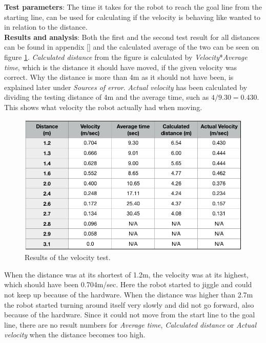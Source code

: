 \textbf{Test parameters}: The time it takes for the robot to reach the goal line from the starting line, can be used for calculating if the velocity is behaving like wanted to in relation to the distance.\\

\textbf{Results and analysis}: Both the first and the second test result for all distances can be found in appendix \ref{} and the calculated average of the two can be seen on figure \ref{fig:TableVelocity}. \textit{Calculated distance} from the figure is calculated by \textit{Velocity}*\textit{Average time}, which is the distance it should have moved, if the given velocity was correct. Why the distance is more than 4m as it should not have been, is explained later under \textit{Sources of error}. \textit{Actual velocity} has been calculated by dividing the testing distance of 4m and the average time, such as $4/9.30=0.430$. This shows what velocity the robot actually had when moving.

\begin{figure}[H]
    \centering
    \includegraphics[width=\textwidth]{figures/velocity1.png}
    \caption{Results of the velocity test.}
    \label{fig:TableVelocity}
\end{figure}

When the distance was at its shortest of 1.2m, the velocity was at its highest, which should have been 0.704m/sec. Here the robot started to jiggle and could not keep up because of the hardware. When the distance was higher than 2.7m the robot started turning around itself very slowly and did not go forward, also because of the hardware. Since it could not move from the start line to the goal line, there are no result numbers for \textit{Average time}, \textit{Calculated distance} or \textit{Actual velocity} when the distance becomes too high.\\

